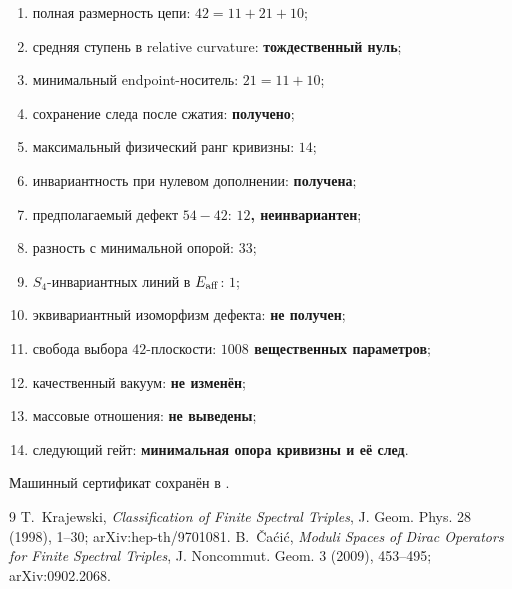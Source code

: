 \begin{protocol}
\begin{enumerate}
 \item полная размерность цепи: \textbf{$42=11+21+10$};
 \item средняя ступень в relative curvature: \textbf{тождественный нуль};
 \item минимальный endpoint-носитель: \textbf{$21=11+10$};
 \item сохранение следа после сжатия: \textbf{получено};
 \item максимальный физический ранг кривизны: \textbf{$14$};
 \item инвариантность при нулевом дополнении: \textbf{получена};
 \item предполагаемый дефект $54-42$: \textbf{$12$, неинвариантен};
 \item разность с минимальной опорой: \textbf{$33$};
 \item $S_4$-инвариантных линий в $E_{\rm aff}$: \textbf{$1$};
 \item эквивариантный изоморфизм дефекта: \textbf{не получен};
 \item свобода выбора $42$-плоскости: \textbf{$1008$ вещественных параметров};
 \item качественный вакуум: \textbf{не изменён};
 \item массовые отношения: \textbf{не выведены};
 \item следующий гейт: \textbf{минимальная опора кривизны и её след}.
\end{enumerate}
\end{protocol}

Машинный сертификат сохранён в
.

\begin{thebibliography}{9}
T.~Krajewski,
\emph{Classification of Finite Spectral Triples},
J. Geom. Phys. 28 (1998), 1--30; arXiv:hep-th/9701081.
B.~\v{C}a\'ci\'c,
\emph{Moduli Spaces of Dirac Operators for Finite Spectral Triples},
J. Noncommut. Geom. 3 (2009), 453--495; arXiv:0902.2068.
\end{thebibliography}